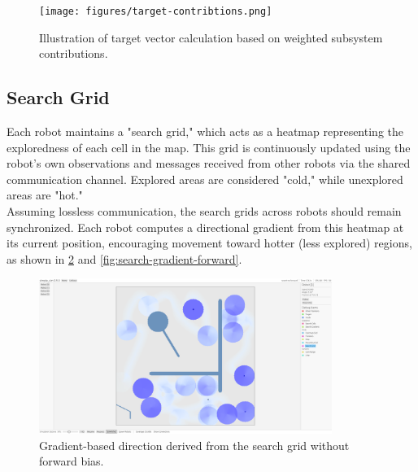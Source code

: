 \begin{figure}[H]
    \begin{center}
        \texttt{[image: figures/target-contribtions.png]}
    \end{center}
    \caption{Illustration of target vector calculation based on weighted subsystem contributions.}
    \label{fig:target-contributions}
\end{figure}



\subsection{Search Grid}

Each robot maintains a "search grid," which acts as a heatmap representing the exploredness of each cell in the map. This grid is continuously updated using the robot’s own observations and messages received from other robots via the shared communication channel. Explored areas are considered "cold," while unexplored areas are "hot."\\

Assuming lossless communication, the search grids across robots should remain synchronized. Each robot computes a directional gradient from this heatmap at its current position, encouraging movement toward hotter (less explored) regions, as shown in \cref{fig:search-gradient-no-forward} and \cref{fig:search-gradient-forward}.

\begin{figure}[H]
    \begin{center}
        \includegraphics[width=0.85\textwidth]{./figures/screenshots/no-forward.png}
    \end{center}
    \caption{Gradient-based direction derived from the search grid without forward bias.}
    \label{fig:search-gradient-no-forward}
\end{figure}

